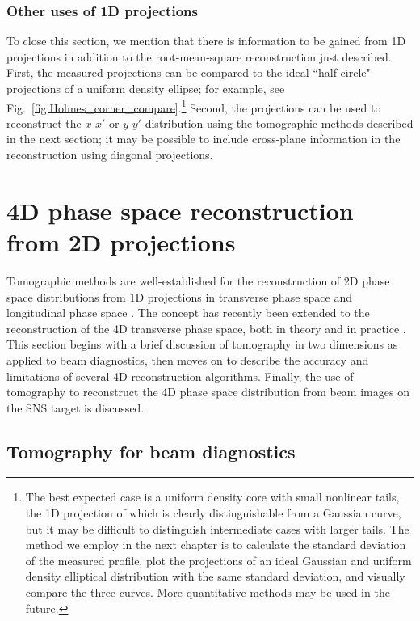 \subsubsection{Other uses of 1D projections}

To close this section, we mention that there is information to be gained from 1D projections in addition to the root-mean-square reconstruction just described. First, the measured projections can be compared to the ideal ``half-circle" projections of a uniform density ellipse; for example, see Fig.~\ref{fig:Holmes_corner_compare}.\footnote{The best expected case is a uniform density core with small nonlinear tails, the 1D projection of which is clearly distinguishable from a Gaussian curve, but it may be difficult to distinguish intermediate cases with larger tails. The method we employ in the next chapter is to calculate the standard deviation of the measured profile, plot the projections of an ideal Gaussian and uniform density elliptical distribution with the same standard deviation, and visually compare the three curves. More quantitative methods may be used in the future.} Second, the projections can be used to reconstruct the $x$-$x'$ or $y$-$y'$ distribution using the tomographic methods described in the next section; it may be possible to include cross-plane information in the reconstruction using diagonal projections. 


\section{4D phase space reconstruction from 2D projections}

Tomographic methods are well-established for the reconstruction of 2D phase space distributions from 1D projections in transverse phase space \cite{Hock2014} and longitudinal phase space \cite{Evans2014}. The concept has recently been extended to the reconstruction of the 4D transverse phase space, both in theory and in practice \cite{Hock2013b, Wang2019, Wolski2020}. This section begins with a brief discussion of tomography in two dimensions as applied to beam diagnostics, then moves on to describe the accuracy and limitations of several 4D reconstruction algorithms. Finally, the use of tomography to reconstruct the 4D phase space distribution from beam images on the SNS target is discussed. 



\subsection{Tomography for beam diagnostics}

